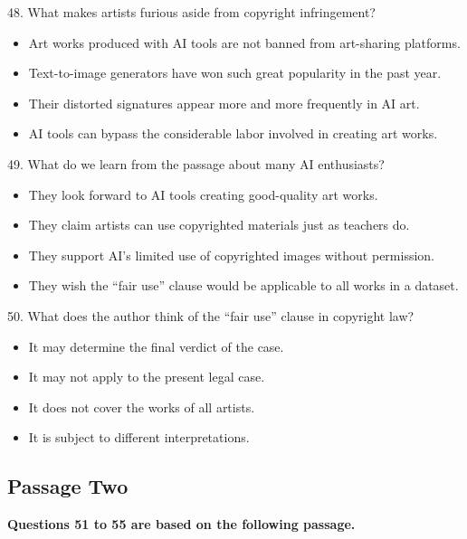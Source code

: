 \documentclass[UTF8,11pt]{ctexart}
\begin{document}
48. What makes artists furious aside from copyright infringement?


\begin{itemize}[leftmargin=2em,itemsep=.2em,topsep=.4em]\item[A.] Art works produced with AI tools are not banned from art-sharing platforms.
\item[B.] Text-to-image generators have won such great popularity in the past year.
\item[C.] Their distorted signatures appear more and more frequently in AI art.
\item[D.] AI tools can bypass the considerable labor involved in creating art works.
\end{itemize}

49. What do we learn from the passage about many AI enthusiasts?


\begin{itemize}[leftmargin=2em,itemsep=.2em,topsep=.4em]\item[A.] They look forward to AI tools creating good-quality art works.
\item[B.] They claim artists can use copyrighted materials just as teachers do.
\item[C.] They support AI’s limited use of copyrighted images without permission.
\item[D.] They wish the “fair use” clause would be applicable to all works in a dataset.
\end{itemize}

50. What does the author think of the “fair use” clause in copyright law?


\begin{itemize}[leftmargin=2em,itemsep=.2em,topsep=.4em]\item[A.] It may determine the final verdict of the case.
\item[B.] It may not apply to the present legal case.
\item[C.] It does not cover the works of all artists.
\item[D.] It is subject to different interpretations.
\end{itemize}

\subsection*{\textbf{Passage Two}}


\textbf{Questions 51 to 55 are based on the following passage.}
\end{document}
